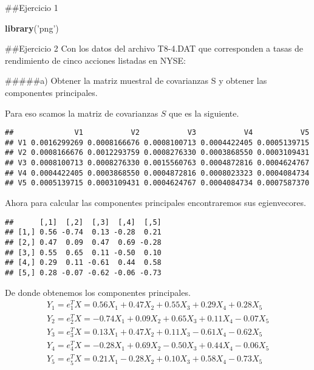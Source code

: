 \documentclass[]{article}
\newenvironment{Shaded}{\begin{snugshade}}{\end{snugshade}}
\newcommand{\KeywordTok}[1]{\textcolor[rgb]{0.13,0.29,0.53}{\textbf{#1}}}
\newcommand{\NormalTok}[1]{#1}
\newcommand{\StringTok}[1]{\textcolor[rgb]{0.31,0.60,0.02}{#1}}
\begin{document}
\#\#Ejercicio 1

\begin{Shaded}
\begin{Highlighting}[]
\KeywordTok{library}\NormalTok{(}\StringTok{'png'}\NormalTok{)}
\end{Highlighting}
\end{Shaded}

\#\#Ejercicio 2 Con los datos del archivo T8-4.DAT que corresponden a
tasas de rendimiento de cinco acciones listadas en NYSE:

\#\#\#\#\#a) Obtener la matriz muestral de covarianzas S y obtener las
componentes principales.

Para eso scamos la matriz de covarianzas \(S\) que es la siguiente.

\begin{verbatim}
##              V1           V2           V3           V4           V5
## V1 0.0016299269 0.0008166676 0.0008100713 0.0004422405 0.0005139715
## V2 0.0008166676 0.0012293759 0.0008276330 0.0003868550 0.0003109431
## V3 0.0008100713 0.0008276330 0.0015560763 0.0004872816 0.0004624767
## V4 0.0004422405 0.0003868550 0.0004872816 0.0008023323 0.0004084734
## V5 0.0005139715 0.0003109431 0.0004624767 0.0004084734 0.0007587370
\end{verbatim}

Ahora para calcular las componentes principales encontraremos sus
egienvecores.

\begin{verbatim}
##      [,1]  [,2]  [,3]  [,4]  [,5]
## [1,] 0.56 -0.74  0.13 -0.28  0.21
## [2,] 0.47  0.09  0.47  0.69 -0.28
## [3,] 0.55  0.65  0.11 -0.50  0.10
## [4,] 0.29  0.11 -0.61  0.44  0.58
## [5,] 0.28 -0.07 -0.62 -0.06 -0.73
\end{verbatim}

De donde obtenemos los componentes principales. \[\begin{array}{l}
Y_{1} = e_{1}^TX = 0.56X_{1} + 0.47X_{2}+ 0.55X_{3} + 0.29X_{4} + 0.28X_{5}\\
Y_{2} = e_{2}^TX = -0.74X_{1} + 0.09X_{2} + 0.65X_{3} + 0.11X_{4} - 0.07X_{5}\\
Y_{3} = e_{3}^TX = 0.13X_{1} + 0.47X_{2} +0.11X_{3} - 0.61X_{4} - 0.62X_{5}\\
Y_{4} = e_{4}^TX = -0.28X_{1} + 0.69X_{2} - 0.50X_{3} + 0.44X_{4} - 0.06X_{5}\\
Y_{5} = e_{5}^TX = 0.21X_{1} - 0.28X_{2} + 0.10X_{3} +  0.58X_{4} - 0.73X_{5}\\
\end{array}\]
\end{document}
